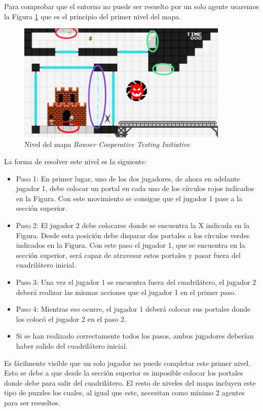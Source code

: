 Para comprobar que el entorno no puede ser resuelto por un solo agente usaremos la Figura \ref {fig:mapa} que es el principio del primer nivel del mapa.
\begin{figure}[ht]
    \centering
    \includegraphics[width=0.9\textwidth]{img/mario-1-level.png}
    \caption{Nivel del mapa \textit{Bowser Cooperative Testing Initiative} \cite {mari0-mapa}}
    \label{fig:mapa}
\end{figure}

La forma de resolver este nivel es la siguiente:
\begin{itemize}
    \item Paso 1: En primer lugar, uno de los dos jugadores, de ahora en adelante jugador 1, debe colocar un portal en cada uno de los círculos rojos indicados en la Figura. Con este movimiento se consigue que el jugador 1 pase a la sección superior.
    \item Paso 2: El jugador 2 debe colocarse donde se encuentra la X indicada en la Figura. Desde esta posición debe disparar dos portales a los círculos verdes indicados en la Figura. Con este paso el jugador 1, que se encuentra en la sección superior, será capaz de atravesar estos portales y pasar fuera del cuadrilátero inicial.
    \item Paso 3: Una vez el jugador 1 se encuentra fuera del cuadrilátero, el jugador 2 deberá realizar las mismas acciones que el jugador 1 en el primer paso.
    \item Paso 4: Mientras eso ocurre, el jugador 1 deberá colocar sus portales donde los colocó el jugador 2 en el paso 2.
    \item Si se han realizado correctamente todos los pasos, ambos jugadores deberían haber salido del cuadrilátero inicial.
\end{itemize}

Es fácilmente visible que un solo jugador no puede completar este primer nivel. Esto se debe a que desde la sección superior es imposible colocar los portales donde debe para salir del cuadrilátero. El resto de niveles del mapa incluyen este tipo de puzzles los cuales, al igual que este, necesitan como mínimo 2 agentes para ser resueltos.
